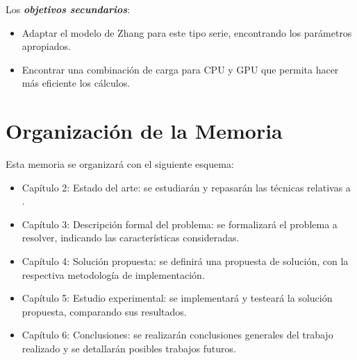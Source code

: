 Los \emph{\textbf{objetivos secundarios}}:
\begin{itemize}
	\item Adaptar el modelo de Zhang para este tipo serie, encontrando los parámetros apropiados.
	\item Encontrar una combinación de carga para CPU y GPU que permita hacer más eficiente los cálculos.
\end{itemize}

\section{Organización de la Memoria}

Esta memoria se organizará con el siguiente esquema:
\begin{itemize}
	\item Capítulo 2: Estado del arte: se estudiarán y repasarán las técnicas relativas a .
	\item Capítulo 3: Descripción formal del problema: se formalizará el problema a resolver, indicando las características consideradas.
	\item Capítulo 4: Solución propuesta: se definirá una propuesta de solución, con la respectiva metodología de implementación. 
	\item Capítulo 5: Estudio experimental: se implementará y testeará la solución propuesta, comparando sus resultados.
	\item Capítulo 6: Conclusiones: se realizarán conclusiones generales del trabajo realizado y se detallarán posibles trabajos futuros.
\end{itemize}
